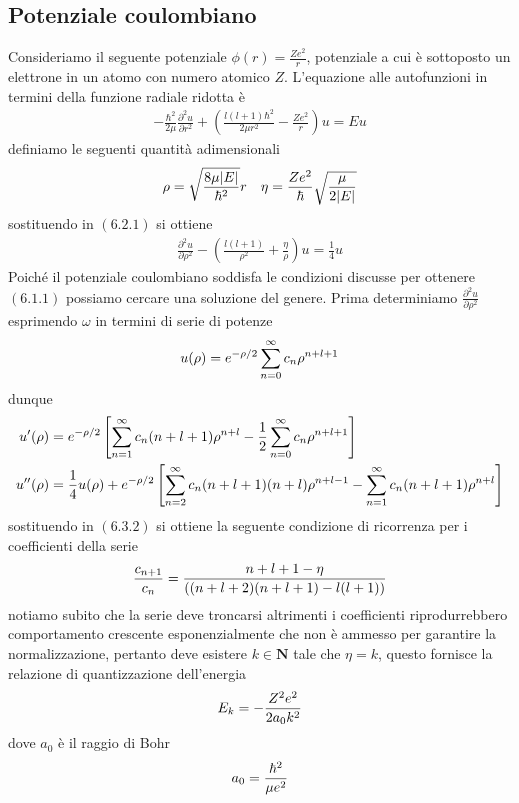 \documentclass{article}
\begin{document}
\subsection{Potenziale coulombiano}
Consideriamo il seguente potenziale $\phi(r) = \frac{Ze^2}{r}$, potenziale a cui è sottoposto un elettrone in un atomo con numero atomico $Z$. L'equazione alle autofunzioni in termini della funzione radiale ridotta è
\begin{gather}
    -\frac{\hbar^2}{2\mu}\frac{\partial^2 u}{\partial r^2} + \left( \frac{l(l+1)\hbar^2}{2\mu r^2} - \frac{Ze^2}{r} \right)u = Eu \tag{6.2.1}
\end{gather}
definiamo le seguenti quantità adimensionali
\begin{gather}
    \rho = \sqrt{\frac{8\mu|E|}{\hbar^2}}r \quad \eta = \frac{Ze^2}{\hbar}\sqrt{\frac{\mu}{2|E|}} \notag
\end{gather}
sostituendo in $(6.2.1)$ si ottiene
\begin{gather}
    \frac{\partial^2 u}{\partial \rho^2} - \left( \frac{l(l+1)}{\rho^2} + \frac{\eta}{\rho} \right)u = \frac{1}{4}u \tag{6.2.2}
\end{gather}
Poiché il potenziale coulombiano soddisfa le condizioni discusse per ottenere $(6.1.1)$ possiamo cercare una soluzione del genere. Prima determiniamo $\frac{\partial^2 u}{\partial \rho^2}$ esprimendo $\omega$ in termini di serie di potenze
\begin{align}
    u(\rho) = e^{-\rho/2}\sum_{n=0}^\infty c_n\rho^{n+l+1} \notag
\end{align}
dunque
\begin{align}
    u'(\rho) &= e^{-\rho/2}\left[ \sum_{n=1}^\infty c_n(n+l+1)\rho^{n+l} - \frac{1}{2}\sum_{n=0}^\infty c_n\rho^{n+l+1} \right] \notag \\
    u''(\rho) &= \frac{1}{4}u(\rho) + e^{-\rho/2}\left[ \sum_{n=2}^\infty c_n(n+l+1)(n+l)\rho^{n+l-1} -\sum_{n=1}^\infty c_n(n+l+1)\rho^{n+l} \right] \notag
\end{align}
sostituendo in $(6.3.2)$ si ottiene la seguente condizione di ricorrenza per i coefficienti della serie
\begin{align}
    \frac{c_{n+1}}{c_n} = \frac{n+l+1-\eta}{\left( (n+l+2)(n+l+1) - l(l+1) \right)} \notag
\end{align}
notiamo subito che la serie deve troncarsi altrimenti i coefficienti riprodurrebbero comportamento crescente esponenzialmente che non è ammesso per garantire la normalizzazione, pertanto deve esistere $k \in \mathbf{N}$ tale che $\eta = k$, questo fornisce la relazione di quantizzazione dell'energia
\begin{gather}
    E_k = -\frac{Z^2e^2}{2a_0k^2} \notag
\end{gather}
dove $a_0$ è il raggio di Bohr
\begin{gather}
    a_0 = \frac{\hbar^2}{\mu e^2} \notag
\end{gather}
\end{document}
